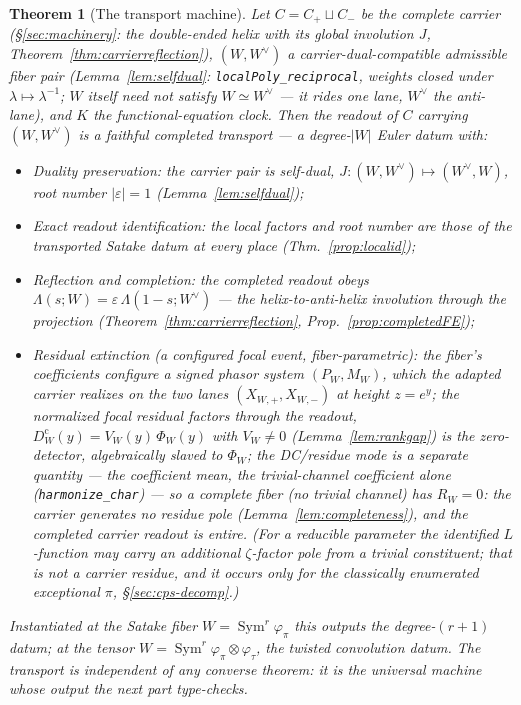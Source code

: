 \documentclass[11pt]{article}
\newtheorem{theorem}{Theorem}
\theoremstyle{definition}
\newcommand{\Sym}{\operatorname{Sym}}
\begin{document}
\begin{theorem}[The transport machine]\label{thm:transport}
Let $C=C_+\sqcup C_-$ be the complete carrier (\S\ref{sec:machinery}: the double-ended helix with its global
involution $J$, Theorem~\ref{thm:carrierreflection}), $(W,W^\vee)$ a \emph{carrier-dual-compatible} admissible
fiber pair (Lemma~\ref{lem:selfdual}: \texttt{localPoly\_reciprocal}, weights closed under
$\lambda\mapsto\lambda^{-1}$; $W$ itself need not satisfy $W\simeq W^\vee$ --- it rides one lane, $W^\vee$ the
anti-lane), and $K$ the functional-equation clock. Then the readout of $C$ carrying $(W,W^\vee)$ is a
\emph{faithful completed transport} --- a degree-$|W|$ Euler datum with:
\begin{itemize}
\item[\textup{(a)}] \emph{Duality preservation}: the carrier pair is self-dual, $J\colon(W,W^\vee)\mapsto
(W^\vee,W)$, root number $|\varepsilon|=1$ (Lemma~\ref{lem:selfdual});
\item[\textup{(b)}] \emph{Exact readout identification}: the local factors and root number are those of the
transported Satake datum at every place (Thm.~\ref{prop:localid});
\item[\textup{(c)}] \emph{Reflection and completion}: the completed readout obeys
$\Lambda(s;W)=\varepsilon\,\Lambda(1-s;W^\vee)$ --- the helix-to-anti-helix involution through the projection
(Theorem~\ref{thm:carrierreflection}, Prop.~\ref{prop:completedFE});
\item[\textup{(d)}] \emph{Residual extinction (a configured focal event, fiber-parametric)}: the fiber's
coefficients configure a signed phasor system $(P_W,M_W)$, which the adapted carrier realizes on the two lanes
$(X_{W,+},X_{W,-})$ at height $z=e^y$; the normalized focal residual factors through the readout,
$D^{\mathrm c}_W(y)=V_W(y)\,\Phi_W(y)$ with $V_W\neq0$ (Lemma~\ref{lem:rankgap}) is the \emph{zero-detector},
algebraically slaved to $\Phi_W$; the DC/residue mode is a \emph{separate} quantity --- the coefficient mean,
the trivial-channel coefficient alone (\texttt{harmonize\_char}) --- so a \emph{complete} fiber (no trivial
channel) has $R_W=0$: \emph{the carrier generates no residue pole} (Lemma~\ref{lem:completeness}), and the
completed carrier readout is entire. (For a reducible parameter the identified $L$-function may carry an
additional $\zeta$-factor pole from a trivial constituent; that is not a carrier residue, and it occurs only
for the classically enumerated exceptional $\pi$, \S\ref{sec:cps-decomp}.)
\end{itemize}
Instantiated at the Satake fiber $W=\Sym^r\varphi_\pi$ this outputs the degree-$(r+1)$ datum; at the tensor
$W=\Sym^r\varphi_\pi\otimes\varphi_\tau$, the twisted convolution datum. The transport is independent of any
converse theorem: it is the universal machine whose output the next part type-checks.
\end{theorem}
\end{document}
